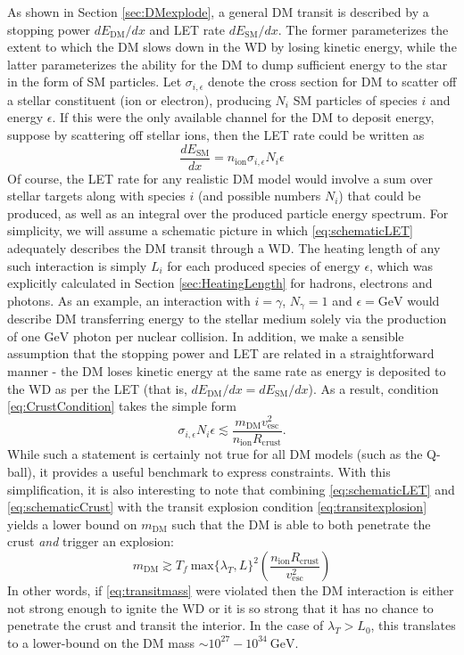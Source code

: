 \documentclass[twocolumn,showpacs,preprintnumbers,amsmath,amssymb,prd]{revtex4}
\newcommand{\GeV}{\text{GeV}}
\def\r{\right)}
\def\l{\left(}
\begin{document}
As shown in Section \ref{sec:DMexplode}, a general DM transit is described by a stopping power $d E_\text{DM}/dx$ and LET rate $dE_\text{SM} /dx$. The former parameterizes the extent to which the DM slows down in the WD by losing kinetic energy, while the latter parameterizes the ability for the DM to dump sufficient energy to the star in the form of SM particles. Let $\sigma_{i,\epsilon}$ denote the cross section for DM to scatter off a stellar constituent (ion or electron), producing $N_i$ SM particles of species $i$ and energy $\epsilon$. If this were the only available channel for the DM to deposit energy, suppose by scattering off stellar ions, then the LET rate could be written as
\begin{equation}
\label{eq:schematicLET}
\frac{d E_\text{SM}}{d x} = n_\text{ion} \sigma_{i,\epsilon} N_i\epsilon
\end{equation}
Of course, the LET rate for any realistic DM model would involve a sum over stellar targets along with species $i$ (and possible numbers $N_i$) that could be produced, as well as an integral over the produced particle energy spectrum. For simplicity, we will assume a schematic picture in which \eqref{eq:schematicLET} adequately describes the DM transit through a WD. The heating length of any such interaction is simply $L_i$ for each produced species of energy $\epsilon$, which was explicitly calculated in Section \ref{sec:HeatingLength} for hadrons, electrons and photons. As an example, an interaction with $i = \gamma$, $N_\gamma = 1$ and $\epsilon = \GeV$ would describe DM transferring energy to the stellar medium solely via the production of one $\GeV$ photon per nuclear collision. In addition, we make a sensible assumption that the stopping power and LET are related in a straightforward manner - the DM loses kinetic energy at the same rate as energy is deposited to the WD as per the LET (that is, $d E_\text{DM}/dx = dE_\text{SM} /dx$). As a result, condition \eqref{eq:CrustCondition} takes the simple form
\begin{equation}
\label{eq:schematicCrust}
\sigma_{i,\epsilon} N_i\epsilon \lesssim \frac{m_\text{DM}v_\text{esc}^2}{n_\text{ion} R_\text{crust}}.
\end{equation}
While such a statement is certainly not true for all DM models (such as the Q-ball), it provides a useful benchmark to express constraints. With this simplification, it is also interesting to note that combining \eqref{eq:schematicLET} and \eqref{eq:schematicCrust} with the transit explosion condition \eqref{eq:transitexplosion} yields a lower bound on $m_{\text{DM}}$ such that the DM is able to both penetrate the crust \emph{and} trigger an explosion:
\begin{equation}
\label{eq:transitmass}
m_{\text{DM}} \gtrsim  T_f ~\text{max}\{\lambda_T, L\}^2 \l \frac{n_{\text{ion}} R_{\text{crust}}}{v_{\text{esc}}^2} \r
\end{equation}
In other words, if \eqref{eq:transitmass} were violated then the DM interaction is either not strong enough to ignite the WD or it is so strong that it has no chance to penetrate the crust and transit the interior. In the case of $\lambda_T > L_0$, this translates to a lower-bound on the DM mass $\sim 10^{27} - 10^{34} ~\GeV$.
\end{document}
